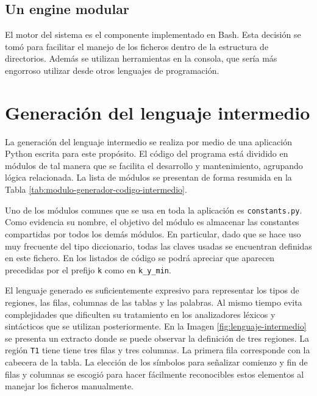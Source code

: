 \subsection{Un engine modular}

El motor del sistema es el componente implementado en Bash. Esta decisión se tomó para facilitar el manejo de los ficheros dentro de la estructura de directorios. Además se utilizan herramientas en la consola, que sería más engorroso utilizar desde otros lenguajes de programación.

\section{Generación del lenguaje intermedio}

La generación del lenguaje intermedio se realiza por medio de una aplicación Python escrita para este propósito. El código del programa está dividido en módulos de tal manera que se facilita el desarrollo y mantenimiento, agrupando lógica relacionada. La lista de módulos se presentan de forma resumida en la Tabla \ref{tab:modulo-generador-codigo-intermedio}.

Uno de los módulos comunes que se usa en toda la aplicación es \verb|constants.py|. Como evidencia su nombre, el objetivo del módulo es almacenar las constantes compartidas por todos los demás módulos. En particular, dado que se hace uso muy frecuente del tipo diccionario, todas las claves usadas se encuentran definidas en este fichero. En los listados de código se podrá apreciar que aparecen precedidas por el prefijo \verb|k| como en \verb|k_y_min|.

El lenguaje generado es suficientemente expresivo para representar los tipos de regiones, las filas, columnas de las tablas y las palabras. Al mismo tiempo evita complejidades que dificulten su tratamiento en los analizadores léxicos y sintácticos que se utilizan posteriormente. En la Imagen \ref{fig:lenguaje-intermedio} se presenta un extracto donde se puede observar la definición de tres regiones. La región \verb|T1| tiene tiene tres filas y tres columnas. La primera fila corresponde con la cabecera de la tabla. La elección de los símbolos para señalizar comienzo y fin de filas y columnas se escogió para hacer fácilmente reconocibles estos elementos al manejar los ficheros manualmente. 

